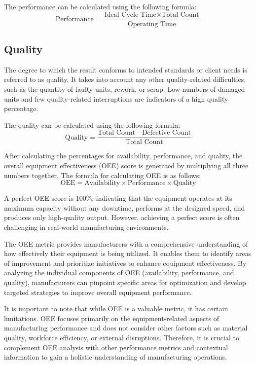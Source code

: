 \documentclass[12pt]{article}
\begin{document}
The performance can be calculated using the following formula:
\vspace{0.3cm}
\[
\text{Performance} = \frac{\text{Ideal Cycle Time} \times \text{Total Count}}{\text{Operating Time}}
\]

\subsection{Quality}
The degree to which the result conforms to intended standards or client needs is referred to as quality. It takes into account any other quality-related difficulties, such as the quantity of faulty units, rework, or scrap. Low numbers of damaged units and few quality-related interruptions are indicators of a high quality percentage.

The quality can be calculated using the following formula:
\vspace{0.3cm}
\[
\text{Quality} = \frac{\text{Total Count - Defective Count}}{\text{Total Count}}
\]

After calculating the percentages for availability, performance, and quality, the overall equipment effectiveness (OEE) score is generated by multiplying all three numbers together.
The formula for calculating OEE is as follows:
\vspace{0.3cm}
\[
\text{OEE} = \text{Availability} \times \text{Performance} \times \text{Quality}
\]

A perfect OEE score is 100\%, indicating that the equipment operates at its maximum capacity without any downtime, performs at the designed speed, and produces only high-quality output. However, achieving a perfect score is often challenging in real-world manufacturing environments.

The OEE metric provides manufacturers with a comprehensive understanding of how effectively their equipment is being utilized. It enables them to identify areas of improvement and prioritize initiatives to enhance equipment effectiveness. By analyzing the individual components of OEE (availability, performance, and quality), manufacturers can pinpoint specific areas for optimization and develop targeted strategies to improve overall equipment performance.

It is important to note that while OEE is a valuable metric, it has certain limitations. OEE focuses primarily on the equipment-related aspects of manufacturing performance and does not consider other factors such as material quality, workforce efficiency, or external disruptions. Therefore, it is crucial to complement OEE analysis with other performance metrics and contextual information to gain a holistic understanding of manufacturing operations.
\end{document}
